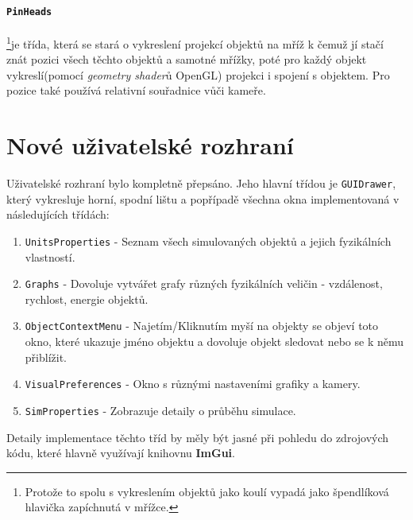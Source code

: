 \paragraph{\texttt{PinHeads}}\footnote{Protože to spolu s vykreslením objektů jako koulí vypadá jako špendlíková hlavička zapíchnutá v mřížce.}je třída, která se stará o vykreslení projekcí objektů na mříž k čemuž jí stačí znát pozici všech těchto objektů a samotné mřížky, poté pro každý objekt vykreslí(pomocí \textit{geometry shader}ů OpenGL) projekci i spojení s objektem. Pro pozice také používá relativní souřadnice vůči kameře.


\section{Nové uživatelské rozhraní}
Uživatelské rozhraní bylo kompletně přepsáno. Jeho hlavní třídou je \texttt{GUIDrawer}, který vykresluje horní, spodní lištu a popřípadě všechna okna implementovaná v následujících třídách:
\begin{enumerate}	
	\item \texttt{UnitsProperties} - Seznam všech simulovaných objektů a jejich fyzikálních vlastností.
	\item \texttt{Graphs} - Dovoluje vytvářet grafy různých fyzikálních veličin - vzdálenost, rychlost, energie objektů.
	\item \texttt{ObjectContextMenu} - Najetím/Kliknutím myší na objekty se objeví toto okno, které ukazuje jméno objektu a dovoluje objekt sledovat nebo se k němu přiblížit.
	\item \texttt{VisualPreferences} - Okno s různými nastaveními grafiky a kamery.
	\item \texttt{SimProperties} - Zobrazuje detaily o průběhu simulace.
\end{enumerate}
Detaily implementace těchto tříd by měly být jasné při pohledu do zdrojových kódu, které hlavně využívají knihovnu \textbf{ImGui}. 
